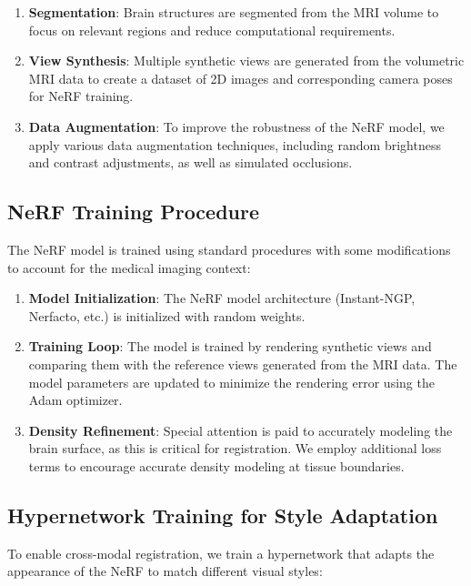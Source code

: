 \begin{enumerate}
    \item \textbf{Segmentation}: Brain structures are segmented from the MRI volume to focus on relevant regions and reduce computational requirements.
    
    \item \textbf{View Synthesis}: Multiple synthetic views are generated from the volumetric MRI data to create a dataset of 2D images and corresponding camera poses for NeRF training.
    
    \item \textbf{Data Augmentation}: To improve the robustness of the NeRF model, we apply various data augmentation techniques, including random brightness and contrast adjustments, as well as simulated occlusions.
\end{enumerate}

\subsection{NeRF Training Procedure}

The NeRF model is trained using standard procedures with some modifications to account for the medical imaging context:

\begin{enumerate}
    \item \textbf{Model Initialization}: The NeRF model architecture (Instant-NGP, Nerfacto, etc.) is initialized with random weights.
    
    \item \textbf{Training Loop}: The model is trained by rendering synthetic views and comparing them with the reference views generated from the MRI data. The model parameters are updated to minimize the rendering error using the Adam optimizer.
    
    \item \textbf{Density Refinement}: Special attention is paid to accurately modeling the brain surface, as this is critical for registration. We employ additional loss terms to encourage accurate density modeling at tissue boundaries.
\end{enumerate}

\subsection{Hypernetwork Training for Style Adaptation}

To enable cross-modal registration, we train a hypernetwork that adapts the appearance of the NeRF to match different visual styles:


